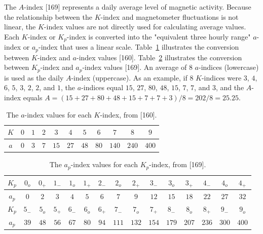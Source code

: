 \documentclass[sn-mathphys-num]{sn-jnl}%
\begin{document}
The $A$-index [169] represents a daily average level of magnetic activity. Because the relationship between the $K$-index and magnetometer fluctuations is not linear, the $K$-index values are not directly used for calculating average values. Each $K$-index or $K_{p}$-index is converted into the "equivalent three hourly range" $a$-index or $a_{p}$-index that uses a linear scale. Table~\ref{tab:a} illustrates the conversion between $K$-index and $a$-index values [160]. Table~\ref{tab:ap} illustrates the conversion between $K_{p}$-index and $a_{p}$-index values [169]. An average of $8$ $a$-indices (lowercase) is used as the daily $A$-index (uppercase). As an example, if $8$ $K$-indices were $3$, $4$, $6$, $5$, $3$, $2$, $2$, and $1$, the $a$-indices equal $15$, $27$, $80$, $48$, $15$, $7$, $7$, and $3$, and the $A$-index equals $A = (15 + 27 + 80 + 48 + 15 + 7 + 7 + 3)/8 = 202 / 8 = 25.25$.

\begin{table}[!ht]
    \centering
    \caption{The $a$-index values for each $K$-index, from [160].}
    \label{tab:a}
    \begin{tabular}{|c|c|c|c|c|c|c|c|c|c|c|}
        \hline
        $K$ & $0$ & $1$ & $2$ & $3$ & $4$ & $5$ & $6$ & $7$ & $8$ & $9$ \\ \hline
        $a$ & $0$ & $3$ & $7$ & $15$ & $27$ & $48$ & $80$ & $140$ & $240$ & $400$ \\ \hline
    \end{tabular}
\end{table}

\begin{table}[!ht]
    \centering
    \caption{The $a_{p}$-index values for each $K_{p}$-index, from [169].}
    \label{tab:ap}
    \begin{tabular}{|c|c|c|c|c|c|c|c|c|c|c|c|c|c|c|}
        \hline
        $K_{p}$ & $0_{o}$ & $0_{+}$ & $1_{-}$ & $1_{o}$ & $1_{+}$ & $2_{-}$ & $2_{o}$ & $2_{+}$ & $3_{-}$ & $3_{o}$ & $3_{+}$ & $4_{-}$ & $4_{o}$ & $4_{+}$ \\ \hline
        $a_{p}$ & $0$ & $2$ & $3$ & $4$ & $5$ & $6$ & $7$ & $9$ & $12$ & $15$ & $18$ & $22$ & $27$ & $32$ \\ \hline
        $K_{p}$ & $5_{-}$ & $5_{o}$ & $5_{+}$ & $6_{-}$ & $6_{o}$ & $6_{+}$ & $7_{-}$ & $7_{o}$ & $7_{+}$ & $8_{-}$ & $8_{o}$ & $8_{+}$ & $9_{-}$ & $9_{o}$ \\ \hline
        $a_{p}$ & $39$ & $48$ & $56$ & $67$ & $80$ & $94$ & $111$ & $132$ & $154$ & $179$ & $207$ & $236$ & $300$ & $400$ \\ \hline
 \end{tabular}
\end{table}
\end{document}
